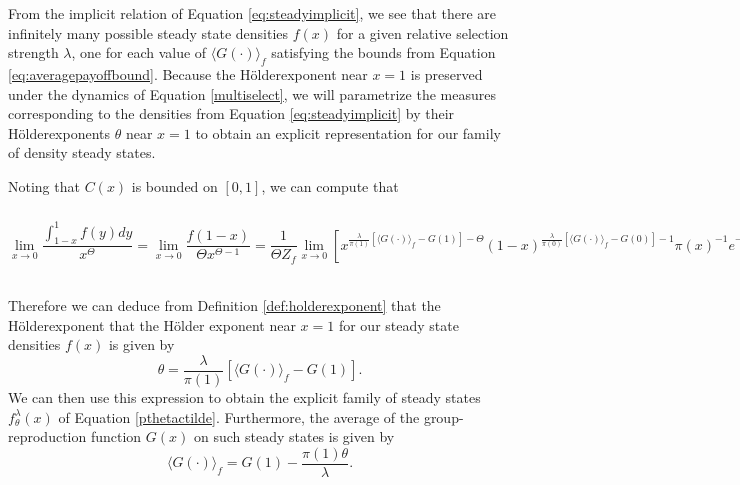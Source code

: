 \documentclass[11pt]{article}
\numberwithin{equation}{section}
\newcommand{\ds}{\displaystyle}
\newcommand{\holder}{H{\"o}lder\:}
\begin{document}
{From the implicit relation of Equation \eqref{eq:steadyimplicit}, we see that there are infinitely many possible steady state densities $f(x)$ for a given relative selection strength $\lambda$, one for each %
value of $\langle G(\cdot) \rangle_f$ satisfying the bounds from Equation \eqref{eq:averagepayoffbound}.  Because the \holder exponent near $x=1$ is preserved under the dynamics of Equation \eqref{multiselect}, we will parametrize the measures corresponding to the densities from Equation \eqref{eq:steadyimplicit} by their \holder exponents $\theta$ near $x=1$ to obtain an explicit representation for our family of density steady states. 

Noting that $C(x)$ is bounded on $[0,1]$, we can compute that
%
\begin{dmath*}
 \ds\lim_{x \to 0} \frac{\int_{1-x}^1 f(y) dy}{x^{\Theta}} = \ds\lim_{x \to 0}  \frac{f(1-x)}{\Theta x^{\Theta - 1}} =  \frac{1}{\Theta Z_f} \ds\lim_{x \to 0} \left[  x^{\frac{\lambda}{\pi(1)} \left[\langle G(\cdot) \rangle_f - G(1) \right] - \Theta } \left( 1 - x\right)^{\frac{\lambda}{\pi(0)} \left[\langle G(\cdot) \rangle_f - G(0) \right] - 1} %
 \pi(x)^{-1} e^{- \lambda \int_{1-x}^1 \frac{C(s)}{\pi(s)} ds} \right] 
 = \left\{
     \begin{array}{lr}
       0 & : \Theta < \left( \frac{\lambda}{\pi(1)} \right) \left[\langle G(\cdot) \rangle_f - G(1) \right] \\
       (\Theta \pi(1) Z_f)^{-1} & : \Theta =  \left( \frac{\lambda}{\pi(1)} \right) \left[\langle G(\cdot) \rangle_f - G(1)\right] \\
       \infty & : \Theta > \left( \frac{\lambda}{\pi(1)} \right) \left[\langle G(\cdot) \rangle_f - G(1)\right]
     \end{array}
   \right. .
\end{dmath*}
Therefore we can deduce from Definition \ref{def:holderexponent} that the \holder exponent that the Hölder exponent near $x=1$ for our steady state densities $f(x)$ is given by
\begin{equation} \label{eq:thetaofaverage}
\theta = \frac{\lambda}{\pi(1)} \left[\langle G(\cdot) \rangle_f - G(1) \right].
\end{equation}
We can then use this expression to obtain the explicit family of steady states $f^{\lambda}_{\theta}(x)$ of Equation \eqref{pthetactilde}. Furthermore, the average of the group-reproduction function $G(x)$ on such steady states is given by
%
\begin{equation} \label{eq:averageoftheta}
    \langle G(\cdot) \rangle_f = G(1) - \frac{\pi(1) \theta}{\lambda}.

\end{equation}}
\end{document}
